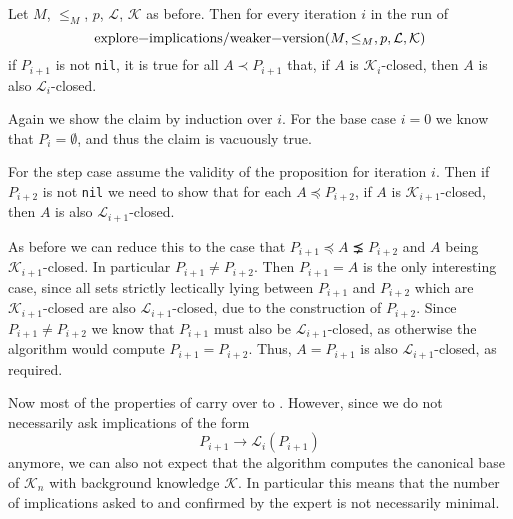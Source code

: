 \begin{Proposition}
  \label{prop:explore-implications-weaker-version-closedness-persists}
  Let $M$, $\leq_{M}$, $p$, $\mathcal{L}$, $\mathcal{K}$ as before.  Then for every
  iteration $i$ in the run of
  \begin{equation*}
    \text{\lstinline{explore-implications/weaker-version}}(M, \leq_{M}, p, \mathcal{L}, \mathcal{K})
  \end{equation*}
  if $P_{i+1}$ is not \lstinline{nil}, it is true for all $A \prec P_{i+1}$ that, if $A$
  is $\mathcal{K}_{i}$-closed, then $A$ is also $\mathcal{L}_{i}$-closed.
\end{Proposition}
\begin{Proof}
  Again we show the claim by induction over $i$.  For the base case $i = 0$ we know that
  $P_{i} = \emptyset$, and thus the claim is vacuously true.

  For the step case assume the validity of the proposition for iteration $i$.  Then if
  $P_{i+2}$ is not \lstinline{nil} we need to show that for each $A \preceq P_{i+2}$, if
  $A$ is $\mathcal{K}_{i+1}$-closed, then $A$ is also $\mathcal{L}_{i+1}$-closed.

  As before we can reduce this to the case that $P_{i+1} \preceq A \precneq P_{i+2}$ and
  $A$ being $\mathcal{K}_{i+1}$-closed.  In particular $P_{i+1} \neq P_{i+2}$.  Then
  $P_{i+1} = A$ is the only interesting case, since all sets strictly lectically lying
  between $P_{i+1}$ and $P_{i+2}$ which are $\mathcal{K}_{i+1}$-closed are also
  $\mathcal{L}_{i+1}$-closed, due to the construction of $P_{i+2}$.  Since $P_{i+1} \neq
  P_{i+2}$ we know that $P_{i+1}$ must also be $\mathcal{L}_{i+1}$-closed, as otherwise
  the algorithm would compute $P_{i+1} = P_{i+2}$.  Thus, $A = P_{i+1}$ is also
  $\mathcal{L}_{i+1}$-closed, as required.
\end{Proof}

Now most of the properties of  carry over to
.  However, since we do not necessarily ask
implications of the form
\begin{equation}
  \label{eq:39}
  P_{i+1} \to \mathcal{L}_{i}(P_{i+1})
\end{equation}
anymore, we can also not expect that the algorithm computes the canonical base of
$\mathcal{K}_{n}$ with background knowledge $\mathcal{K}$.  In particular this means that
the number of implications asked to and confirmed by the expert is not necessarily
minimal.

